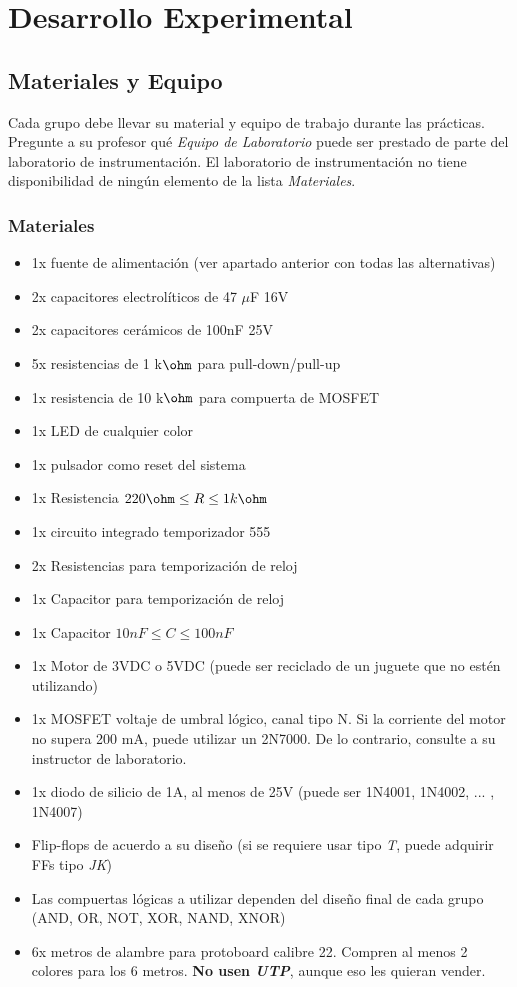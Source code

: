 
\section{Desarrollo Experimental}
\subsection{Materiales y Equipo}

Cada grupo debe llevar su material y equipo de trabajo durante las prácticas. Pregunte a su profesor qué \emph{Equipo de Laboratorio} puede ser prestado
de parte del laboratorio de instrumentación. El laboratorio de instrumentación no tiene disponibilidad de ningún elemento de la lista \emph{Materiales}.

\subsubsection*{Materiales}
\begin{itemize}
    \item 1x fuente de alimentación (ver apartado anterior con todas las alternativas)
    \item 2x capacitores electrolíticos de 47 $\mu$F 16V
    \item 2x capacitores cerámicos de 100nF 25V
    \item 5x resistencias de 1 k$\ohm$ para pull-down/pull-up
    \item 1x resistencia de 10 k$\ohm$ para compuerta de MOSFET
    \item 1x LED de cualquier color
    \item 1x pulsador como reset del sistema
    \item 1x Resistencia $220 \ohm \leq R \leq 1 k\ohm$
    \item 1x circuito integrado temporizador 555
    \item 2x Resistencias para temporización de reloj
    \item 1x Capacitor para temporización de reloj
    \item 1x Capacitor $10nF \leq C \leq 100nF$
    \item 1x Motor de 3VDC o 5VDC (puede ser reciclado de un juguete que no estén utilizando)
    \item 1x MOSFET voltaje de umbral lógico, canal tipo N. Si la corriente del motor no supera 200 mA, puede utilizar un 2N7000. De lo contrario, consulte a su instructor
            de laboratorio.
    \item 1x diodo de silicio de 1A, al menos de 25V (puede ser 1N4001, 1N4002, ... , 1N4007)
    \item Flip-flops de acuerdo a su diseño (si se requiere usar tipo \emph{T}, puede adquirir FFs tipo \emph{JK})
    \item Las compuertas lógicas a utilizar dependen del diseño final de cada grupo (AND, OR, NOT, XOR, NAND, XNOR)
    \item 6x metros de alambre para protoboard calibre 22. Compren al menos 2 colores para los 6 metros. \textbf{No usen \emph{UTP}}, aunque eso les quieran vender.
\end{itemize}


